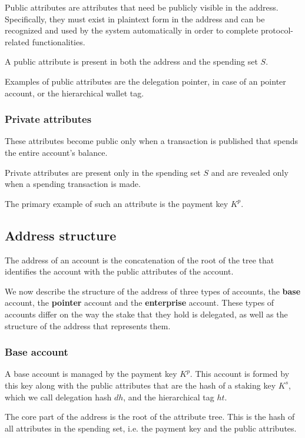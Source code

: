 Public attributes are attributes that need be publicly visible in the address. Specifically, they must exist in plaintext form in the address and can be recognized and used by the system automatically in order to complete protocol-related functionalities.

A public attribute is present in both the address and the spending set $S$.

Examples of public attributes are the delegation pointer, in case of an pointer account, or the hierarchical wallet tag.

\subsubsection{Private attributes}

These attributes become public only when a transaction is published that spends the entire account's balance.

Private attributes are present only in the spending set $S$ and are revealed only when a spending transaction is made.

The primary example of such an attribute is the payment key $K^p$.

\subsection{Address structure}

The address of an account is the concatenation of the root of the tree that identifies the account with the public attributes of the account.

We now describe the structure of the address of three types of accounts, the \textbf{base} account, the \textbf{pointer} account and the \textbf{enterprise} account. These types of accounts differ on the way the stake that they hold is delegated, as well as the structure of the address that represents them.

\subsubsection{Base account}\label{subsubsec:base_account_v2}

A base account is managed by the payment key $K^p$. This account is formed by this key along with the public attributes that are the hash of a staking key $K^s$, which we call delegation hash $dh$, and the hierarchical tag $ht$.

The core part of the address is the root of the attribute tree. This is the hash of all attributes in the spending set, i.e. the payment key and the public attributes.

